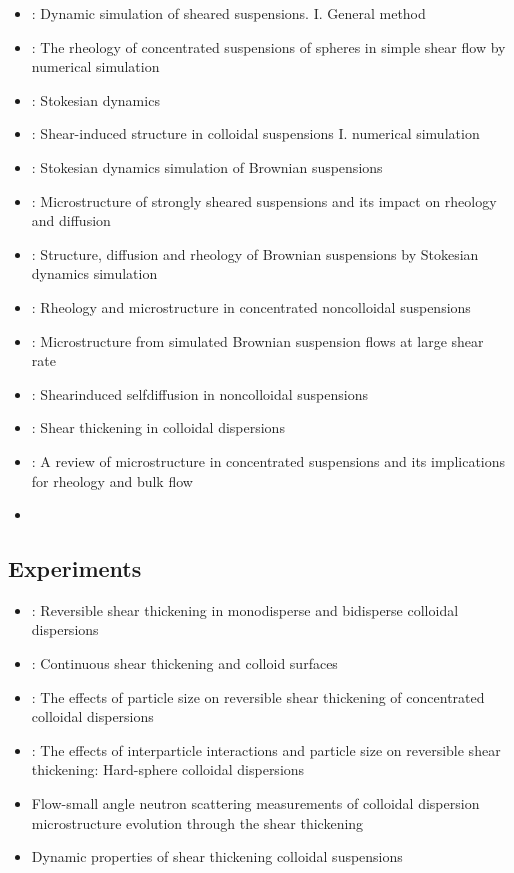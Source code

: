 \documentclass[12pt]{article}
\begin{document}
\begin{itemize}
  \item 
  \citet{Bossis_1984}:
  Dynamic simulation of sheared suspensions. I. General method
  \item
  \citet{Brady_1985}:
  The rheology of concentrated suspensions of spheres in simple shear flow by numerical simulation
  \item 
  \citet{Brady_1988}:
  Stokesian dynamics
  \item
  \citet{Bossis_1988}:
  Shear-induced structure in colloidal suspensions I. numerical simulation

  \item \citet{Phung_1996}:
  Stokesian dynamics simulation of Brownian suspensions
  \item \citet{Brady_1997}: 
  Microstructure of strongly sheared suspensions and its impact on rheology and diffusion

  \item \citet{Foss_2000}:
  Structure, diffusion and rheology of {B}rownian suspensions by {S}tokesian dynamics simulation
  \item \citet{Sierou_2002}:
  Rheology and microstructure in concentrated noncolloidal suspensions
  \item \citet{Morris_2002}:
  Microstructure from simulated Brownian suspension flows at large shear rate
  \item \citet{Sierou_2004}:
  Shearinduced selfdiffusion in noncolloidal suspensions
  \item \citet{Wagner_2009}:
  Shear thickening in colloidal dispersions
  \item \citet{Morris_2009}:
  A review of microstructure in concentrated suspensions 
  and its implications for rheology and bulk flow
 \item 
\end{itemize}

\subsection*{Experiments}

\begin{itemize}
 \item \citet{Bender_1996}:
Reversible shear thickening in monodisperse and bidisperse colloidal dispersions
 \item \citet{Melrose_1996}:
Continuous shear thickening and colloid surfaces
 \item \citet{Maranzano_2001}:
The effects of particle size on reversible shear thickening of concentrated colloidal dispersions
 \item \citet{Maranzano_2001a}:
The effects of interparticle interactions and particle size 
on reversible shear thickening: Hard-sphere colloidal dispersions
 \item \citet{Maranzano_2002}
Flow-small angle neutron scattering measurements 
of colloidal dispersion microstructure evolution through the shear thickening 
 \item \cite{Lee_2003}
Dynamic properties of shear thickening colloidal suspensions

 \end{itemize}
\end{document}
